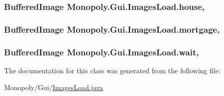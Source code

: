 \subsubsection[{\texorpdfstring{house}{house}}]{\setlength{\rightskip}{0pt plus 5cm}Buffered\+Image Monopoly.\+Gui.\+Images\+Load.\+house\hspace{0.3cm}{\ttfamily [static]}, {\ttfamily [protected]}}\hypertarget{class_monopoly_1_1_gui_1_1_images_load_a085be516ecb31d5b75d8a0219dc223d0}{}\label{class_monopoly_1_1_gui_1_1_images_load_a085be516ecb31d5b75d8a0219dc223d0}
\subsubsection[{\texorpdfstring{mortgage}{mortgage}}]{\setlength{\rightskip}{0pt plus 5cm}Buffered\+Image Monopoly.\+Gui.\+Images\+Load.\+mortgage\hspace{0.3cm}{\ttfamily [static]}, {\ttfamily [protected]}}\hypertarget{class_monopoly_1_1_gui_1_1_images_load_af40cb07b349a5d377faf4b4caf9aa248}{}\label{class_monopoly_1_1_gui_1_1_images_load_af40cb07b349a5d377faf4b4caf9aa248}
\subsubsection[{\texorpdfstring{wait}{wait}}]{\setlength{\rightskip}{0pt plus 5cm}Buffered\+Image Monopoly.\+Gui.\+Images\+Load.\+wait\hspace{0.3cm}{\ttfamily [static]}, {\ttfamily [protected]}}\hypertarget{class_monopoly_1_1_gui_1_1_images_load_a2aa38351567bba7feaafb3bc48bde590}{}\label{class_monopoly_1_1_gui_1_1_images_load_a2aa38351567bba7feaafb3bc48bde590}


The documentation for this class was generated from the following file\+:\begin{DoxyCompactItemize}
\item 
Monopoly/\+Gui/\hyperlink{_images_load_8java}{Images\+Load.\+java}\end{DoxyCompactItemize}
